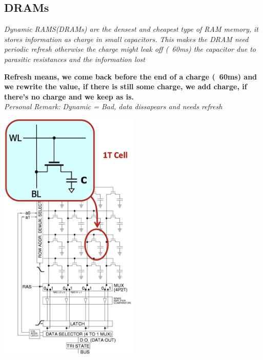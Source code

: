 \subsection{DRAMs}
\textit{Dynamic RAMS(DRAMs) are the densest and cheapest type of RAM memory, it stores information as charge in small capacitors. This makes the DRAM need periodic refresh otherwise the charge might leak off (~60ms) the capacitor due to parasitic resistances and the information lost} \\ \vspace*{5px}

\begin{minipage}[htp]{0.45\textwidth}
    \textbf{Refresh means, we come back before the end of a charge (~60ms) and we rewrite the value, if there is still some charge, we add charge, if there's no charge and we keep as is.} \\ \vspace*{5px}
    \textit{Personal Remark: Dynamic = Bad, data dissapears and needs refresh}
\end{minipage}
\hfill
\vline  
\hfill
\begin{minipage}[htp]{0.45\textwidth}
    \begin{center}
        \includegraphics[width=0.5\textwidth]{chapters/chapter1c/images/dram.png}  
    \end{center}
\end{minipage}

